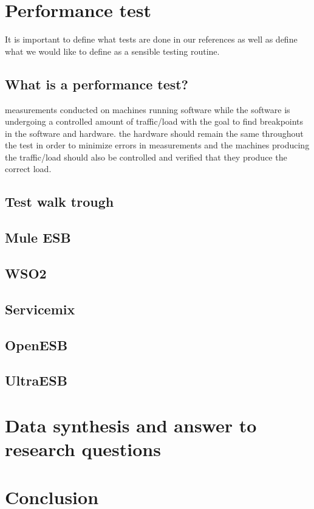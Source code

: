 \documentclass{llncs}
\begin{document}
\section{Performance test}
It is important to define what tests are done in our references as well as define what we would like to define as a sensible testing routine.
\subsection{What is a performance test?}

measurements conducted on machines running software while the software is undergoing a controlled amount of traffic/load with the goal to find breakpoints in the software and hardware. the hardware should remain the same throughout the test in order to minimize errors in measurements and the machines producing the traffic/load should also be controlled and verified that they produce the correct load. 
\subsection{Test walk trough}
	\subsection{Mule ESB}
	\subsection{WSO2}
	\subsection{Servicemix}
	\subsection{OpenESB}
	\subsection{UltraESB}

\section{Data synthesis and answer to research questions}
\section{Conclusion}



\end{document}
